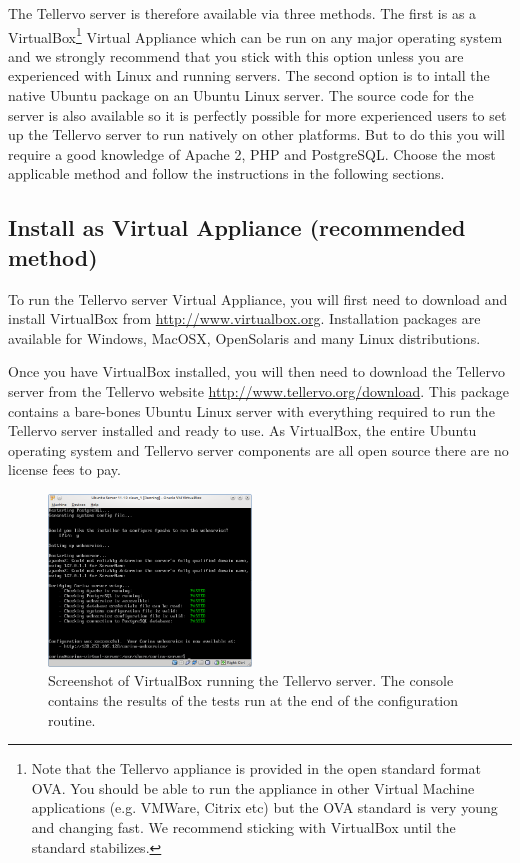 The Tellervo server is therefore available via three methods.  The first is as a VirtualBox\footnote{Note that the Tellervo appliance is provided in the open standard format OVA.  You should be able to run the appliance in other Virtual Machine applications (e.g. VMWare, Citrix etc) but the OVA standard is very young and changing fast.  We recommend sticking with VirtualBox until the standard stabilizes. } Virtual Appliance which can be run on any major operating system and we strongly recommend that you stick with this option unless you are experienced with Linux and running servers.  The second option is to intall the native Ubuntu package on an Ubuntu Linux server. The source code for the server is also available so it is perfectly possible for more experienced users to set up the Tellervo server to run natively on other platforms.  But to do this you will require a good knowledge of Apache 2, PHP and PostgreSQL.  Choose the most applicable method and follow the instructions in the following sections.


\subsection[Install as Virtual Appliance]{Install as Virtual Appliance (recommended method)}
\label{txt:virtualAppliance}
To run the Tellervo server Virtual Appliance, you will first need to download and install VirtualBox from \url{http://www.virtualbox.org}.  Installation packages are available for Windows, MacOSX, OpenSolaris and many Linux distributions.

Once you have VirtualBox installed, you will then need to download the Tellervo server from the Tellervo website \url{http://www.tellervo.org/download}.  This package contains a bare-bones Ubuntu Linux server with everything required to run the Tellervo server installed and ready to use.  As VirtualBox, the entire Ubuntu operating system and Tellervo server components are all open source there are no license fees to pay.

\begin{figure}
  \begin{center}
    \includegraphics[width=0.48\textwidth]{Images/serverconfig.png}
  \end{center}
  \caption{Screenshot of VirtualBox running the Tellervo server.  The console contains the results of the tests run at the end of the configuration routine.}
  \label{fig:serverconfig}
\end{figure}

